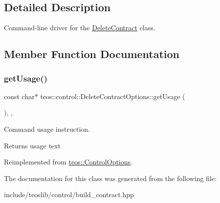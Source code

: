 \subsection{Detailed Description}
Command-\/line driver for the \mbox{\hyperlink{classteos_1_1control_1_1_delete_contract}{Delete\+Contract}} class. 

\subsection{Member Function Documentation}
\mbox{\label{classteos_1_1control_1_1_delete_contract_options_abca9a6e25e4bcaf14b130199f32e4fbf}} 
\subsubsection{\texorpdfstring{get\+Usage()}{getUsage()}}
{\footnotesize\ttfamily const char$\ast$ teos\+::control\+::\+Delete\+Contract\+Options\+::get\+Usage (\begin{DoxyParamCaption}{ }\end{DoxyParamCaption})\hspace{0.3cm}{\ttfamily [inline]}, {\ttfamily [protected]}, {\ttfamily [virtual]}}



Command \textquotesingle{}usage\textquotesingle{} instruction. 

\begin{DoxyReturn}{Returns}
usage text 
\end{DoxyReturn}


Reimplemented from \mbox{\hyperlink{classteos_1_1_control_options_a0aa5671f9bc750ed5280c26c543874f3}{teos\+::\+Control\+Options}}.



The documentation for this class was generated from the following file\+:\begin{DoxyCompactItemize}
\item 
include/teoslib/control/build\+\_\+contract.\+hpp\end{DoxyCompactItemize}
